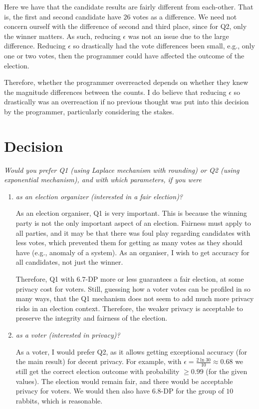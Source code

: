 \documentclass[parskip=half]{scrartcl}
\begin{document}
\begin{enumerate}
    Here we have that the candidate results are fairly different from
    each-other. That is, the first and second candidate have $26$ votes as a
    difference. We need not concern ourself with the difference of second and
    third place, since for Q2, only the winner matters. As such, reducing
    $\epsilon$ was not an issue due to the large difference. Reducing
    $\epsilon$ so drastically had the vote differences been small, e.g., only
    one or two votes, then the programmer could have affected the outcome of
    the election.

    Therefore, whether the programmer overreacted depends on whether they knew
    the magnitude differences between the counts. I do believe that reducing
    $\epsilon$ so drastically was an overreaction if no previous thought was
    put into this decision by the programmer, particularly considering the
    stakes.
\end{enumerate}

\section{Decision}

\textit{Would you prefer Q1 (using Laplace mechanism with rounding) or Q2
(using exponential mechanism), and with which parameters, if you were}
\begin{enumerate}
    \item \textit{as an election organizer (interested in a fair election)?}
    
    As an election organiser, Q1 is very important. This is because the winning
    party is not the only important aspect of an election. Fairness must apply
    to all parties, and it may be that there was foul play regarding candidates
    with less votes, which prevented them for getting as many votes as they
    should have (e.g., anomaly of a system). As an organiser, I wish to get
    accuracy for all candidates, not just the winner.

    Therefore, Q1 with $6.7$-DP more or less guarantees a fair election, at
    some privacy cost for voters. Still, guessing how a voter votes can be
    profiled in so many ways, that the Q1 mechanism does not seem to add much
    more privacy risks in an election context. Therefore, the weaker privacy is
    acceptable to preserve the integrity and fairness of the election.

    \item \textit{as a voter (interested in privacy)?}
    
    As a voter, I would prefer Q2, as it allows getting exceptional accuracy
    (for the main result) for decent privacy. For example, with $\epsilon = 
    \frac{2\ln{30}}{10} \approx 0.68$ we still get the correct election outcome
    with probability $\ge 0.99$ (for the given values). The election would
    remain fair, and there would be acceptable privacy for voters. We would
    then also have $6.8$-DP for the group of $10$ rabbits, which is reasonable.
\end{enumerate}
\end{document}
